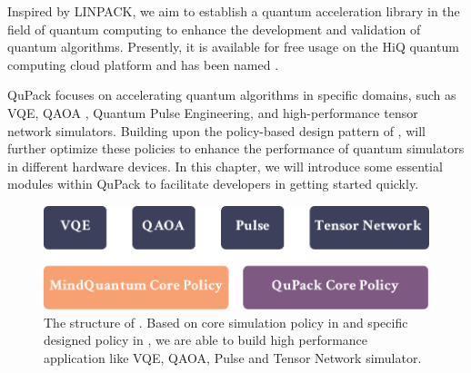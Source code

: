 



Inspired by LINPACK, we aim to establish a quantum acceleration library in the field of quantum computing to enhance the development and validation of quantum algorithms. Presently, it is available for free usage on the HiQ quantum computing cloud platform and has been named \QuPack.

QuPack focuses on accelerating quantum algorithms in specific domains, such as VQE, QAOA , Quantum Pulse Engineering, and high-performance tensor network simulators. Building upon the policy-based design pattern of \MindQuantum, \QuPack will further optimize these policies to enhance the performance of quantum simulators in different hardware devices. In this chapter, we will introduce some essential modules within QuPack to facilitate developers in getting started quickly.

\begin{figure}[ht]
    \centering
    \includegraphics[scale=0.5]{./images/6_qupack_layer.pdf}
    \captionsetup{justification=raggedright,singlelinecheck=false}
    \caption{\label{6_qupack_layer} The structure of \QuPack. Based on core simulation policy in \MindQuantum and specific designed policy in \QuPack, we are able to build high performance application like VQE, QAOA, Pulse and Tensor Network simulator.}
\end{figure}

